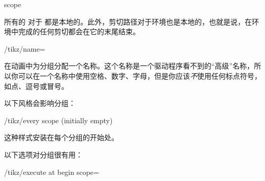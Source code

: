 \begin{environment}{{scope}}

    所有的  对于  都是本地的。此外，剪切路径对于环境也是本地的，也就是说，在环境中完成的任何剪切都会在它的末尾结束。
\begin{codeexample}[]
\end{codeexample}

    \begin{key}{/tikz/name=}

        在动画中为分组分配一个名称。这个名称是一个驱动程序看不到的``高级''名称，所以你可以在一个名称中使用空格、数字、字母，但是你应该\emph{不}使用任何标点符号，如点、逗号或冒号。
    \end{key}


    以下风格会影响分组：
    \begin{stylekey}{/tikz/every scope (initially \normalfont empty)}

        这种样式安装在每个分组的开始处。
    \end{stylekey}


    以下选项对分组很有用：
    \begin{key}{/tikz/execute at begin scope=}


\end{key}
\end{environment}
